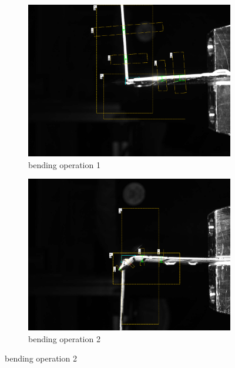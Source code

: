 \begin{figure}[h]
    \centering
    \begin{subfigure}{0.48\textwidth}
        \centering
        \includegraphics[width=\textwidth]{figures/008_inspection/inpection_1_overlay2.png}
        \caption{bending  operation 1}
        \label{subfig:inspection-1}
        \vspace{0.5cm}
    \end{subfigure}\hspace{0.25cm}
    \begin{subfigure}{0.48\textwidth}
        \centering
        \includegraphics[width=\textwidth]{figures/008_inspection/inspection_2_overlay.png}
        \caption{bending operation 2}

\end{subfigure}
\end{figure}
